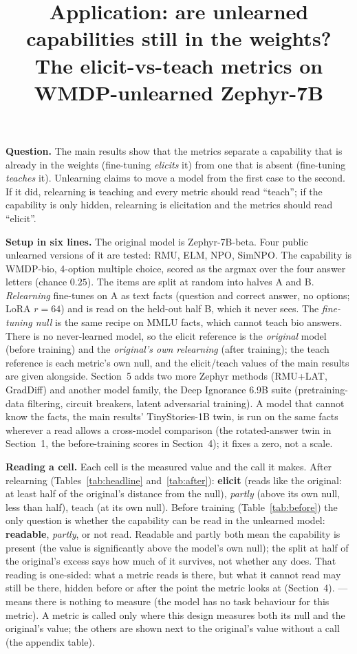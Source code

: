 \documentclass[11pt]{article}
\title{Application: are unlearned capabilities still in the weights?\\[2pt]
\large The elicit-vs-teach metrics on WMDP-unlearned Zephyr-7B}
\date{}
\begin{document}
\maketitle
\vspace{-2em}

\noindent\textbf{Question.} The main results show that the metrics separate a capability that is
already in the weights (fine-tuning \emph{elicits} it) from one that is absent (fine-tuning
\emph{teaches} it). Unlearning claims to move a model from the first case to the second. If it
did, relearning is teaching and every metric should read ``teach''; if the capability is only
hidden, relearning is elicitation and the metrics should read ``elicit''.

\medskip\noindent\textbf{Setup in six lines.} The original model is Zephyr-7B-beta. Four public
unlearned versions of it are tested: RMU, ELM, NPO, SimNPO. The capability is WMDP-bio, 4-option
multiple choice, scored as the argmax over the four answer letters (chance $0.25$). The items are
split at random into halves A and B. \emph{Relearning} fine-tunes on A as text facts (question and
correct answer, no options; LoRA $r{=}64$) and is read on the held-out half B, which it never sees.
The \emph{fine-tuning null} is the same recipe on MMLU facts, which cannot teach bio answers.
There is no never-learned model, so the elicit reference is the \emph{original} model (before
training) and the \emph{original's own relearning} (after training); the teach reference is each
metric's own null, and the elicit/teach values of the main results are given alongside. Section~5 adds two
more Zephyr methods (RMU+LAT, GradDiff) and another model family, the Deep Ignorance 6.9B suite
(pretraining-data filtering, circuit breakers, latent adversarial training). A model
that cannot know the facts, the main results' TinyStories-1B twin, is run on the same facts wherever
a read allows a cross-model comparison (the rotated-answer twin in Section~1, the before-training
scores in Section~4); it fixes a zero, not a scale.

\medskip\noindent\textbf{Reading a cell.} Each cell is the measured value and the call it makes.
After relearning (Tables~\ref{tab:headline} and~\ref{tab:after}): \textbf{elicit} (reads like the
original: at least half of the original's distance from the null), \emph{partly} (above its own
null, less than half), teach (at its own null). Before training (Table~\ref{tab:before}) the only
question is whether the capability can be read in the unlearned model: \textbf{readable},
\emph{partly}, or not read. Readable and partly both mean the capability is present (the value is
significantly above the model's own null); the split at half of the original's excess says how
much of it survives, not whether any does. That reading is one-sided: what a metric reads is there, but what it
cannot read may still be there, hidden before or after the point the metric looks at
(Section~4). --- means there is nothing to measure (the model has no task behaviour for this metric).
A metric is called only where this design measures both its null and the original's value; the
others are shown next to the original's value without a call (the appendix table).
\end{document}

